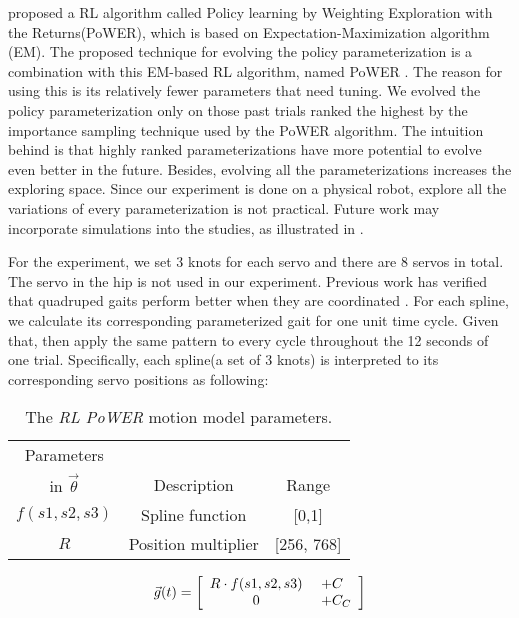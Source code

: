 \cite{kober2009learning-motor-primitives} proposed a RL algorithm
called Policy learning by Weighting Exploration with the
Returns(PoWER), which is based on Expectation-Maximization algorithm
(EM). The proposed technique for evolving the policy parameterization
is a combination with this EM-based RL algorithm, named PoWER \cite{kober2009learning-motor-primitives}. The reason for using this is its relatively fewer parameters that need tuning. We
evolved the policy parameterization only on those past trials ranked
the highest by the importance sampling technique used by the PoWER
algorithm. The intuition behind is that highly ranked
parameterizations have more potential to evolve even better in the
future. Besides, evolving all the parameterizations increases the exploring space. Since our experiment
is done on a physical robot, explore all the variations of every
parameterization is not practical. Future work may incorporate simulations into the studies, as illustrated in \cite{bongard2006resilient-machines-through}.

For the experiment, we set 3 knots for each servo and there are 8
servos in total. The servo in the hip is not used in
our experiment. Previous work has verified that quadruped gaits
perform better when they are coordinated \cite{clune2009evolving-coordinated-quadruped} \cite{clune2011on-the-performance-of-indirect-encoding}
\cite{valsalam2008modular-neuroevolution-for-multilegged}. For each spline, we calculate its corresponding parameterized gait for one unit time cycle. Given that, then apply the same
pattern to every cycle throughout the 12 seconds of one
trial. Specifically, each spline(a set of 3 knots) is interpreted to its corresponding servo positions as
following:

\begin{table}[b]
\begin{center}
\begin{tabular}{|c|c|c|}
\hline
Parameters        &                           &       \\
in $\vec{\theta}$ & Description               & Range \\
\hline
\hline
$f(s1,s2,s3)$        & Spline function           & [0,1] \\  %
\hline
$R$          & Position multiplier                & [256, 768] \\
\hline
\end{tabular}
\caption{The \emph{RL PoWER} motion model parameters.}
\label{tab:params}
\end{center}
\end{table}


\[
\vec{g}(t) =
\left[ {\begin{array}{c@{ }c@{ }c@{ }l@{ }l}
R \cdot f(s1, s2, s3) & \ \          & \             & \            & + C \\ %
0                              & \             & \             & \            & + C_C \\ %
\end{array} } \right]
\]



